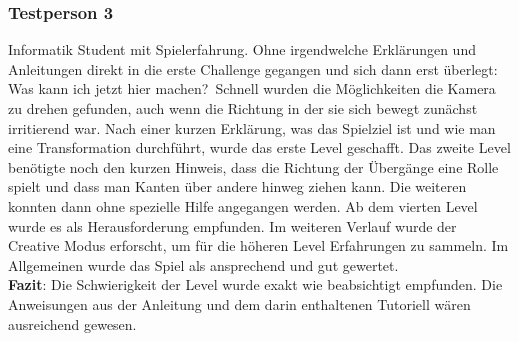 \subsubsection*{Testperson 3}

Informatik Student mit Spielerfahrung. Ohne irgendwelche Erklärungen und Anleitungen direkt in die erste Challenge gegangen und sich dann erst überlegt: \glqq Was kann ich jetzt hier machen?\grqq~Schnell wurden die Möglichkeiten die Kamera zu drehen gefunden, auch wenn die Richtung in der sie sich bewegt zunächst irritierend war. Nach einer kurzen Erklärung, was das Spielziel ist und wie man eine Transformation durchführt, wurde das erste Level geschafft. Das zweite Level benötigte noch den kurzen Hinweis, dass die Richtung der Übergänge eine Rolle spielt und dass man Kanten über andere hinweg ziehen kann. Die weiteren konnten dann ohne spezielle Hilfe angegangen werden. Ab dem vierten Level wurde es als Herausforderung empfunden. Im weiteren Verlauf wurde der Creative Modus erforscht, um für die höheren Level Erfahrungen zu sammeln. Im Allgemeinen wurde das Spiel als ansprechend und gut gewertet.\\

{\bf Fazit}: Die Schwierigkeit der Level wurde exakt wie beabsichtigt empfunden. Die Anweisungen aus der Anleitung und dem darin enthaltenen Tutoriell wären ausreichend gewesen.




